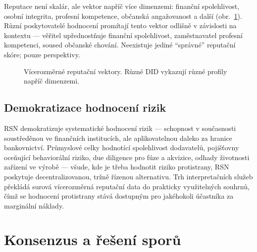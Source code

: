 \documentclass[11pt,a4paper,twocolumn]{article}
\begin{document}
Reputace není skalár, ale vektor napříč více dimenzemi: finanční spolehlivost, osobní integrita, profesní kompetence, občanská angažovanost a další (obr.~\ref{fig:reputation-radar}). Různí poskytovatelé hodnocení promítají tento vektor odlišně v závislosti na kontextu --- věřitel upřednostňuje finanční spolehlivost, zaměstnavatel profesní kompetenci, soused občanské chování. Neexistuje jediné ``správné'' reputační skóre; pouze perspektivy.

\begin{figure}[ht]
\centering
{}
\caption{Vícerozměrné reputační vektory. Různé DID vykazují různé profily napříč dimenzemi.}
\label{fig:reputation-radar}
\end{figure}

\subsection{Demokratizace hodnocení rizik}

RSN demokratizuje systematické hodnocení rizik --- schopnost v současnosti soustředěnou ve finančních institucích, ale aplikovatelnou daleko za hranice bankovnictví. Průmyslové celky hodnotící spolehlivost dodavatelů, pojišťovny oceňující behaviorální riziko, due diligence pro fúze a akvizice, odhady životnosti zařízení ve výrobě --- všude, kde je třeba hodnotit riziko protistrany, RSN poskytuje decentralizovanou, tržně řízenou alternativu. Trh interpretačních služeb překládá surová vícerozměrná reputační data do prakticky využitelných souhrnů, čímž se hodnocení protistrany stává dostupným pro jakéhokoli účastníka za marginální náklady.

\section{Konsenzus a řešení sporů}
\end{document}
